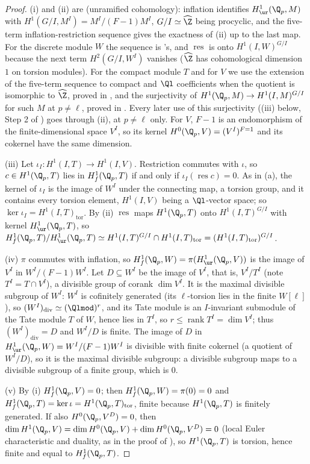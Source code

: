 \begin{proof}
(i) and (ii) are  (unramified cohomology): inflation identifies $H^1_{\ur}(\Q_p,M)$ with $H^1(G/I,M^I)=M^I/(F-1)M^I$, $G/I\simeq\widehat\Z$ being
procyclic, and the five-term inflation-restriction sequence gives the exactness of (ii) up to the last map. For the discrete module $W$ the sequence is
's, and $\operatorname{res}$ is onto $H^1(I,W)^{G/I}$ because the next term $H^2(G/I,W^I)$ vanishes ($\widehat\Z$ has cohomological dimension $1$ on torsion
modules). For the compact module $T$ and for $V$ we use the extension of the five-term sequence to compact and $\Ql$ coefficients when the quotient is isomorphic
to $\widehat\Z$, proved in , and the surjectivity of $H^1(\Q_p,M)\to H^1(I,M)^{G/I}$ for such $M$ at $p\ne\ell$, proved in . Every later use of this surjectivity
((iii) below, Step 2 of ) goes through (ii), at $p\ne\ell$ only. For $V$, $F-1$ is an endomorphism of the finite-dimensional space $V^I$, so its kernel
$H^0(\Q_p,V)=(V^I)^{F=1}$ and its cokernel have the same dimension.

(iii) Let $\iota_I\colon H^1(I,T)\to H^1(I,V)$. Restriction commutes with $\iota$, so $c\in H^1(\Q_p,T)$ lies in $H^1_f(\Q_p,T)$ if and only if $\iota_I(\operatorname{res}c)=0$. As in
(a), the kernel of $\iota_I$ is the image of $W^I$ under the connecting map, a torsion group, and it contains every torsion
element, $H^1(I,V)$ being a $\Ql$-vector space; so $\ker\iota_I=H^1(I,T)_{\mathrm{tor}}$. By (ii) $\operatorname{res}$ maps $H^1(\Q_p,T)$ onto $H^1(I,T)^{G/I}$ with kernel $H^1_{\ur}(\Q_p,T)$,
so $H^1_f(\Q_p,T)/H^1_{\ur}(\Q_p,T)\simeq H^1(I,T)^{G/I}\cap H^1(I,T)_{\mathrm{tor}}=(H^1(I,T)_{\mathrm{tor}})^{G/I}$.

(iv) $\pi$ commutes with inflation, so $H^1_f(\Q_p,W)=\pi(H^1_{\ur}(\Q_p,V))$ is the image of $V^I$ in $W^I/(F-1)W^I$. Let $D\subseteq W^I$ be the image of $V^I$, that is,
$V^I/T^I$ (note $T^I=T\cap V^I$), a divisible group of corank $\dim V^I$. It is the maximal divisible subgroup of $W^I$: $W^I$ is cofinitely generated (its $\ell$-torsion lies
in the finite $W[\ell]$), so $(W^I)_{\mathrm{div}}\simeq(\Qlmod)^r$, and its Tate module is an $I$-invariant submodule of the Tate module $T$ of $W$, hence lies in $T^I$, so
$r\le\operatorname{rank}T^I=\dim V^I$; thus $(W^I)_{\mathrm{div}}=D$ and $W^I/D$ is finite. The image of $D$ in $H^1_{\ur}(\Q_p,W)=W^I/(F-1)W^I$ is divisible with finite cokernel (a quotient
of $W^I/D$), so it is the maximal divisible subgroup: a divisible subgroup maps to a divisible subgroup of a finite group, which is $0$.

(v) By (i) $H^1_f(\Q_p,V)=0$; then $H^1_f(\Q_p,W)=\pi(0)=0$ and $H^1_f(\Q_p,T)=\ker\iota=H^1(\Q_p,T)_{\mathrm{tor}}$, finite because $H^1(\Q_p,T)$ is finitely generated. If also
$H^0(\Q_p,V^D)=0$, then $\dim H^1(\Q_p,V)=\dim H^0(\Q_p,V)+\dim H^0(\Q_p,V^D)=0$ (local Euler characteristic and duality, as in the proof of
), so $H^1(\Q_p,T)$ is torsion, hence finite and equal to $H^1_f(\Q_p,T)$.
\end{proof}


